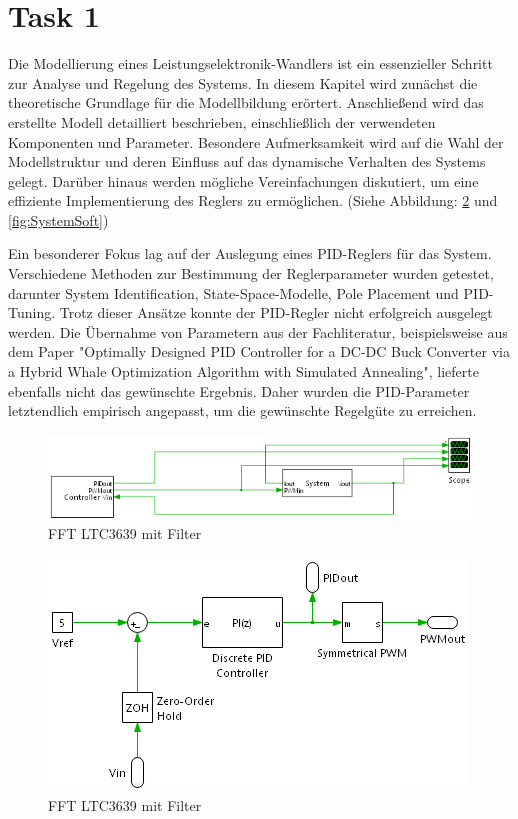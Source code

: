 \section{Task 1} \label{sec:Task1}

Die Modellierung eines Leistungselektronik-Wandlers ist ein essenzieller Schritt zur Analyse und Regelung des Systems. In diesem Kapitel wird zunächst die theoretische Grundlage für die Modellbildung erörtert. Anschließend wird das erstellte Modell detailliert beschrieben, einschließlich der verwendeten Komponenten und Parameter. Besondere Aufmerksamkeit wird auf die Wahl der Modellstruktur und deren Einfluss auf das dynamische Verhalten des Systems gelegt. Darüber hinaus werden mögliche Vereinfachungen diskutiert, um eine effiziente Implementierung des Reglers zu ermöglichen. (Siehe Abbildung: \ref{fig:ControllerSoft} und \ref{fig:SystemSoft})

Ein besonderer Fokus lag auf der Auslegung eines PID-Reglers für das System. Verschiedene Methoden zur Bestimmung der Reglerparameter wurden getestet, darunter System Identification, State-Space-Modelle, Pole Placement und PID-Tuning. Trotz dieser Ansätze konnte der PID-Regler nicht erfolgreich ausgelegt werden. Die Übernahme von Parametern aus der Fachliteratur, beispielsweise aus dem Paper "Optimally Designed PID Controller for a DC-DC Buck Converter via a Hybrid Whale Optimization Algorithm with Simulated Annealing", lieferte ebenfalls nicht das gewünschte Ergebnis. Daher wurden die PID-Parameter letztendlich empirisch angepasst, um die gewünschte Regelgüte zu erreichen.


\begin{figure}[H]
    \centering
    \includegraphics[width=0.8\linewidth]{Figure/Soft.png}
    \caption{FFT LTC3639 mit Filter}
    \label{fig:Soft}
\end{figure}

\begin{figure}[H]
    \centering
    \includegraphics[width=0.8\linewidth]{Figure/ControllerSoft.png}
    \caption{FFT LTC3639 mit Filter}
    \label{fig:ControllerSoft}
\end{figure}

